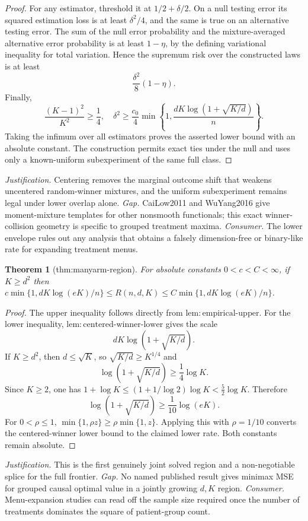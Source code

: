 \documentclass{article}
\newtheorem{theorem}{Theorem}
\begin{document}
\begin{proof}
For any estimator, threshold it at \(1/2+\delta/2\).  On a null testing error its squared estimation loss is at least \(\delta^2/4\), and the same is true on an alternative testing error.  The sum of the null error probability and the mixture-averaged alternative error probability is at least \(1-\eta\), by the defining variational inequality for total variation.  Hence the supremum risk over the constructed laws is at least
\[
 \frac{\delta^2}{8}(1-\eta).
\]
Finally,
\[
 \frac{(K-1)^2}{K^2}\geq\frac14,
 \quad
 \delta^2\geq\frac{c_0}{4}
 \min\left\{1,\frac{dK\log(1+\sqrt{K/d})}{n}\right\}.
\]
Taking the infimum over all estimators proves the asserted lower bound with an absolute constant.  The construction permits exact ties under the null and uses only a known-uniform subexperiment of the same full class.
\end{proof}
\par\smallskip\noindent \textit{Justification.} Centering removes the marginal outcome shift that weakens uncentered random-winner mixtures, and the uniform subexperiment remains legal under lower overlap alone. \textit{Gap.} CaiLow2011 and WuYang2016 give moment-mixture templates for other nonsmooth functionals; this exact winner-collision geometry is specific to grouped treatment maxima. \textit{Consumer.} The lower envelope rules out any analysis that obtains a falsely dimension-free or binary-like rate for expanding treatment menus.

\begin{theorem}[thm:manyarm-region]\label{thm:manyarm-region}
For absolute constants \(0<c<C<\infty\), if \(K\ge d^2\) then \(c\min\{1,dK\log(eK)/n\}\le R(n,d,K)\le C\min\{1,dK\log(eK)/n\}\).
\end{theorem}
\begin{proof}
The upper inequality follows directly from \(\mathrm{lem{:}empirical\text{-}upper}\).  For the lower inequality, \(\mathrm{lem{:}centered\text{-}winner\text{-}lower}\) gives the scale
\[
 dK\log(1+\sqrt{K/d}).
\]
If \(K\geq d^2\), then \(d\leq\sqrt K\), so \(\sqrt{K/d}\geq K^{1/4}\) and
\[
 \log(1+\sqrt{K/d})\geq\frac14\log K.
\]
Since \(K\geq2\), one has \(1+\log K\leq(1+1/\log2)\log K<\frac52\log K\).  Therefore
\[
 \log(1+\sqrt{K/d})\geq\frac1{10}\log(eK).
\]
For \(0<\rho\leq1\), \(\min\{1,\rho z\}\geq\rho\min\{1,z\}\).  Applying this with \(\rho=1/10\) converts the centered-winner lower bound to the claimed lower rate.  Both constants remain absolute.
\end{proof}
\par\smallskip\noindent \textit{Justification.} This is the first genuinely joint solved region and a non-negotiable splice for the full frontier. \textit{Gap.} No named published result gives minimax MSE for grouped causal optimal value in a jointly growing \(d,K\) region. \textit{Consumer.} Menu-expansion studies can read off the sample size required once the number of treatments dominates the square of patient-group count.
\end{document}
